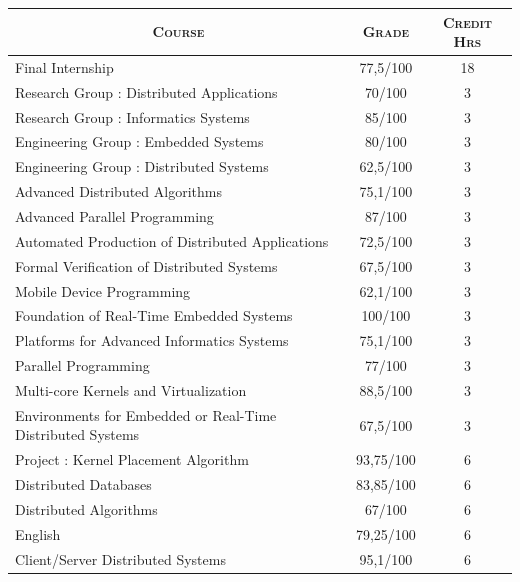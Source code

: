 \documentclass[a4paper,10pt]{article} %
\begin{document}
\begin{center}
\begin{tabular}{lcc}
\multicolumn{1}{c}{\textsc{Course}} & \textsc{Grade}&\textsc{Credit Hrs}\\
\hline
Final Internship                                           &       77,5/100 & 18    \\
Research Group : Distributed Applications                  &       70/100 & 3     \\
Research Group : Informatics Systems                       &       85/100 & 3     \\
Engineering Group : Embedded Systems                       &   80/100 & 3     \\
Engineering Group : Distributed Systems                    &     62,5/100   & 3     \\
\hline
Advanced Distributed Algorithms                            &  75,1/100 & 3     \\
Advanced Parallel Programming                              &    87/100 & 3     \\
Automated Production of Distributed Applications           &  72,5/100 & 3     \\
Formal Verification of Distributed Systems                 &  67,5/100 & 3     \\
Mobile Device Programming                                  &  62,1/100 & 3     \\
Foundation of Real-Time Embedded Systems                   &   100/100 & 3     \\
Platforms for Advanced Informatics Systems                 &  75,1/100 & 3     \\
Parallel Programming                                       &    77/100 & 3     \\
Multi-core Kernels and Virtualization                      &  88,5/100 & 3     \\
Environments for Embedded or Real-Time Distributed Systems &  67,5/100 & 3     \\
\hline
Project : Kernel Placement Algorithm                       & 93,75/100 & 6     \\
Distributed Databases                                      & 83,85/100 & 6     \\
Distributed Algorithms                                     &    67/100 & 6     \\
English                                                    & 79,25/100 & 6     \\
Client/Server Distributed Systems                          &  95,1/100 & 6     \\

\end{tabular}
\end{center}
\end{document}
